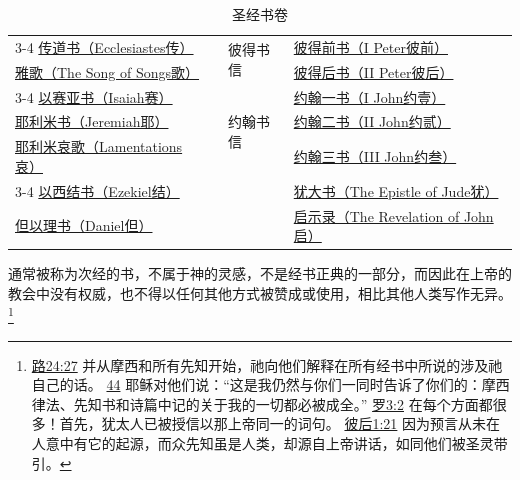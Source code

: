 \documentclass[12pt, a4paper, oneside]{ctexart}
\newcounter{parnum}[section]
\newcommand{\N}{%
   \noindent\refstepcounter{parnum}%
    \makebox[\parindent][l]{\textbf{\arabic{parnum}.}}}
\begin{document}
\begin{table}[ht]
\begin{tabular}{|l l  | l |l | }
			\cline{3-4}
			\href{https://biblehub.com/bibles/ecclesiastes}{传道书（Ecclesiastes传）}      &                &\multirow{2}{*}{彼得书信} & \href{https://biblehub.com/bibles/1_peter}{彼得前书（I Peter彼前）} \\
			\href{https://biblehub.com/bibles/songs}{雅歌（The Song of Songs歌）}   &                &        & \href{https://biblehub.com/bibles/2_peter}{彼得后书（II Peter彼后）} \\
			\cline{3-4}
			\href{https://biblehub.com/bibles/isaiah}{以赛亚书（Isaiah赛）}          &                &\multirow{3}{*}{约翰书信}& \href{https://biblehub.com/bibles/1_john}{约翰一书（I John约壹）} \\
			\href{https://biblehub.com/bibles/jeremiah}{耶利米书（Jeremiah耶）}        &                &        & \href{https://biblehub.com/bibles/2_john}{约翰二书（II John约贰）} \\
			\href{https://biblehub.com/bibles/lamentations}{耶利米哀歌（Lamentations哀）}  &                &        & \href{https://biblehub.com/bibles/3_john}{约翰三书（III John约叁）} \\
			\cline{3-4}
			\href{https://biblehub.com/bibles/ezekiel}{以西结书（Ezekiel结）}         &                &        & \href{https://biblehub.com/bibles/jude}{犹大书（The Epistle of Jude犹）} \\
			\href{https://biblehub.com/bibles/daniel}{但以理书（Daniel但）}          &                &        & \href{https://biblehub.com/bibles/revelation}{启示录（The Revelation of John启）} \\ 
			\hline
		\end{tabular}
		\caption{圣经书卷}
		\label{bible}
	\end{table}

\N 通常被称为次经的书，不属于神的灵感，不是经书正典的一部分，而因此在上帝的教会中没有权威，也不得以任何其他方式被赞成或使用，相比其他人类写作无异。
	\footnote {
		\href{https://biblehub.com/luke/24-27.htm}{路24:27} 并从摩西和所有先知开始，祂向他们解释在所有经书中所说的涉及祂自己的话。
		\href{https://biblehub.com/luke/24-44.htm}{44} 耶稣对他们说：“这是我仍然与你们一同时告诉了你们的：摩西律法、先知书和诗篇中记的关于我的一切都必被成全。” 
		\href{https://biblehub.com/romans/3-2.htm}{罗3:2} 在每个方面都很多！首先，犹太人已被授信以那上帝同一的词句。
		\href{https://biblehub.com/2_peter/1-21.htm}{彼后1:21} 因为预言从未在人意中有它的起源，而众先知虽是人类，却源自上帝讲话，如同他们被圣灵带引。
	}
\end{document}
